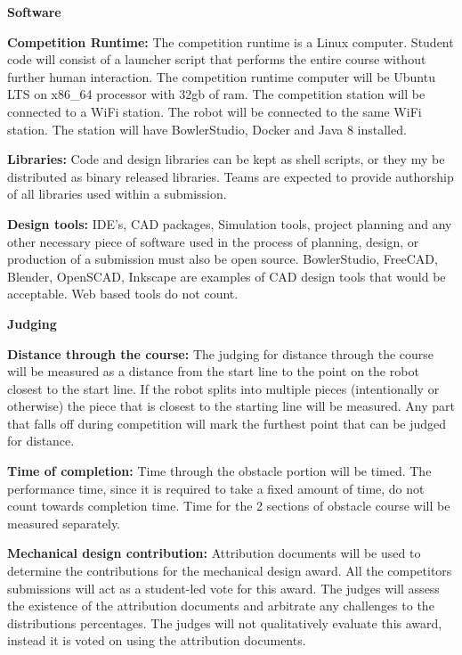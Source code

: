 \documentclass{article}
\begin{document}
 \pagebreak

{\huge \textbf{Software}}

\textbf{Competition Runtime:} The competition runtime is a Linux computer. Student code will consist of a launcher script that performs the entire course without further human interaction. The competition runtime computer will be Ubuntu LTS on x86\_64 processor with 32gb of ram. The competition station will be connected to a WiFi station. The robot will be connected to the same WiFi station. The station will have BowlerStudio, Docker and Java 8 installed. 

\textbf{Libraries:} Code and design libraries can be kept as shell scripts, or they my be distributed as binary released libraries. Teams are expected to provide authorship of all libraries used within a submission. 

\textbf{Design tools:} IDE's, CAD packages, Simulation tools, project planning and any other necessary piece of software used in the process of planning, design, or production of a submission must also be open source. BowlerStudio, FreeCAD, Blender, OpenSCAD, Inkscape are examples of CAD design tools that would be acceptable. Web based tools do not count.  


\vspace{1cm}

 \pagebreak

{\huge \textbf{Judging}}

\textbf{Distance through the course:} The judging for distance through the course will be measured as a distance from the start line to the point on the robot closest to the start line. If the robot splits into multiple pieces (intentionally or otherwise) the piece that is closest to the starting line will be measured. Any part that falls off during competition will mark the furthest point that can be judged for distance.  
 	
\textbf{Time of completion:} Time through the obstacle portion will be timed. The performance time, since it is required to take a fixed amount of time, do not count towards completion time. Time for the 2 sections of obstacle course will be measured separately.  
 	
 \textbf{Mechanical design contribution:} Attribution documents will be used to determine the contributions for the mechanical design award. All the competitors submissions will act as a student-led vote for this award. The judges will assess the existence of the  attribution documents and arbitrate any challenges to the distributions percentages. The judges will not qualitatively evaluate this award, instead it is voted on using the attribution documents. 
 	
\end{document}
